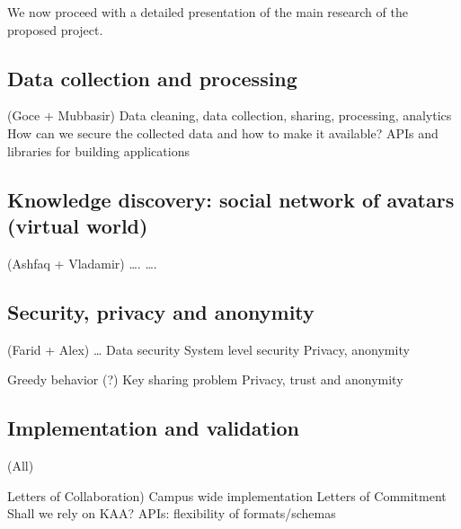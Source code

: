 We now proceed with a detailed presentation of the main research of the proposed project. 


\subsection{Data collection and processing} (Goce + Mubbasir)
Data cleaning, data collection, sharing, processing, analytics
How can we secure the collected data and how to make it available?
APIs and libraries for building applications 

\subsection{Knowledge discovery: social network of avatars (virtual world)}	 (Ashfaq + Vladamir)
….
….

\subsection{Security, privacy and anonymity} (Farid + Alex)
…
Data security
System level security
Privacy, anonymity

Greedy behavior (?)
Key sharing problem 
Privacy, trust and anonymity 

\subsection{Implementation and validation } (All)

Letters of Collaboration)
Campus wide implementation 
Letters of Commitment
Shall we rely on KAA?
APIs: flexibility of formats/schemas

